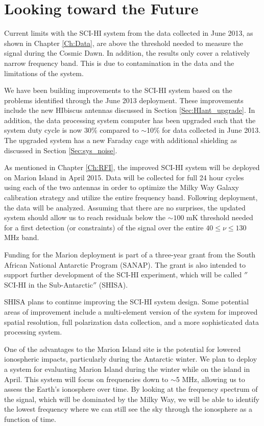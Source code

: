\chapter{Looking toward the Future}\label{Ch:Conclude}

Current limits with the SCI-HI system from the data collected in June 2013, as shown in Chapter \ref{Ch:Data}, are above the threshold needed to measure the \cm signal during the Cosmic Dawn. In addition, the results only cover a relatively narrow frequency band. This is due to contamination in the data and the limitations of the system. 

We have been building improvements to the SCI-HI system based on the problems identified through the June 2013 deployment. These improvements include the new HIbiscus antennas discussed in Section \ref{Sec:HIant_upgrade}. In addition, the data processing system computer has been upgraded such that the system duty cycle is now 30\% compared to $\sim$10\% for data collected in June 2013. The upgraded system has a new Faraday cage with additional shielding as discussed in Section \ref{Sec:sys_noise}. 

As mentioned in Chapter \ref{Ch:RFI}, the improved SCI-HI system will be deployed on Marion Island in April 2015. Data will be collected for full 24 hour cycles using each of the two antennas in order to optimize the Milky Way Galaxy calibration strategy and utilize the entire frequency band. Following deployment, the data will be analyzed. Assuming that there are no surprises, the updated system should allow us to reach residuals below the $\sim100$ mK threshold needed for a first detection (or constraints) of the \cm signal over the entire $40 \leq \nu \leq 130$ MHz band. 

Funding for the Marion deployment is part of a three-year grant from the South African National Antarctic Program (SANAP). The grant is also intended to support further development of the SCI-HI experiment, which will be called $''$SCI-HI in the Sub-Antarctic$''$ (SHISA). 

SHISA plans to continue improving the SCI-HI system design. Some potential areas of improvement include a multi-element version of the system for improved spatial resolution, full polarization data collection, and a more sophisticated data processing system. 

One of the advantages to the Marion Island site is the potential for lowered ionospheric impacts, particularly during the Antarctic winter. We plan to deploy a system for evaluating Marion Island during the winter while on the island in April. This system will focus on frequencies down to $\sim$5 MHz, allowing us to assess the Earth's ionosphere over time. By looking at the frequency spectrum of the signal, which will be dominated by the Milky Way, we will be able to identify the lowest frequency where we can still see the sky through the ionosphere as a function of time. 
